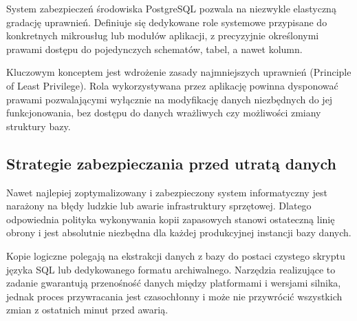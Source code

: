 \documentclass[letterpaper,10pt,english]{sphinxmanual}
\begin{document}
\sphinxAtStartPar
System zabezpieczeń środowiska PostgreSQL pozwala na niezwykle elastyczną gradację uprawnień. Definiuje się dedykowane role systemowe przypisane do konkretnych mikrousług lub modułów aplikacji, z precyzyjnie określonymi prawami dostępu do pojedynczych schematów, tabel, a nawet kolumn.

\sphinxAtStartPar
Kluczowym konceptem jest wdrożenie zasady najmniejszych uprawnień (Principle of Least Privilege). Rola wykorzystywana przez aplikację powinna dysponować prawami pozwalającymi wyłącznie na modyfikację danych niezbędnych do jej funkcjonowania, bez dostępu do danych wrażliwych czy możliwości zmiany struktury bazy.

\begin{sphinxVerbatim}[commandchars=\\\{\}]
\end{sphinxVerbatim}


\subsection{Strategie zabezpieczania przed utratą danych}
\label{\detokenize{rozdzial_2/rozdzial_23/index:strategie-zabezpieczania-przed-utrata-danych}}
\sphinxAtStartPar
Nawet najlepiej zoptymalizowany i zabezpieczony system informatyczny jest narażony na błędy ludzkie lub awarie infrastruktury sprzętowej. Dlatego odpowiednia polityka wykonywania kopii zapasowych stanowi ostateczną linię obrony i jest absolutnie niezbędna dla każdej produkcyjnej instancji bazy danych.

\sphinxAtStartPar
Kopie logiczne polegają na ekstrakcji danych z bazy do postaci czystego skryptu języka SQL lub dedykowanego formatu archiwalnego. Narzędzia realizujące to zadanie gwarantują przenośność danych między platformami i wersjami silnika, jednak proces przywracania jest czasochłonny i może nie przywrócić wszystkich zmian z ostatnich minut przed awarią.
\end{document}
